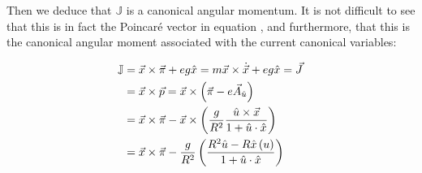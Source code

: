 Then we deduce that $\mathbb{J}$ is a canonical angular momentum. It is not difficult to see that this is in fact the Poincar\'e vector in equation , and furthermore, that this is the canonical angular moment associated with the current canonical variables:

\begin{align*}
\mathbb{J} &= \vec{x}\times\vec{\pi}+{eg}\hat{x} = m{\vec{x}}\times\dot{\vec{x}} + eg\hat{x} = \vec{J}\\ 
&= \vec{x}\times\vec{p} = \vec{x}\times\left( \vec{\pi} -e\vec{A}_{\hat{u}} \right)\\
&= \vec{x}\times\vec{\pi} - \vec{x}\times\left( \frac{g}{R^2}\frac{{\hat{u}\times\vec{x}}}{1+\hat{u}\cdot\hat{x}} \right)\\
&= \vec{x}\times\vec{\pi} -\frac{g}{R^2}\left( \frac{R^2\hat{u} - R\hat{x}\left( u \right)}{1+\hat{u}\cdot\hat{x}} \right)
\end{align*}



